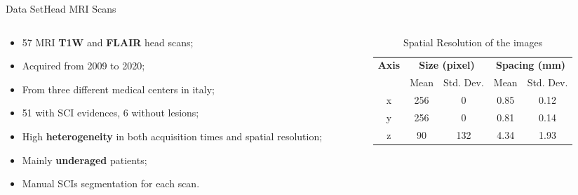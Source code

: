 \documentclass[]{standalone}
\begin{document}
	\begin{frame}{Data Set}{Head MRI Scans}
	\vspace{-25pt}
	\begin{columns}
		\begin{column}{0.5\textwidth}
		\begin{exampleblock}{}
		\begin{itemize}
		\footnotesize
			\item 57 MRI \textbf{T1W} and \textbf{FLAIR} head scans;
			\item Acquired from 2009 to 2020;
			\item From three different medical centers in italy;
			\item 51 with SCI evidences, 6 without lesions;
			\item High \textbf{heterogeneity} in both acquisition times and spatial resolution;
			\item Mainly \textbf{underaged} patients;
			\item Manual SCIs segmentation for each scan.
		\end{itemize}
		\end{exampleblock}
		\end{column}
		\begin{column}{0.52\textwidth}
		\begin{block}{}
		\begin{table}[h!]
			\footnotesize
			\setlength{\tabcolsep}{3pt}
			\centering
			\begin{tabular}{|c|cc|cc|}
			\hline
			\textbf{Axis} & \multicolumn{2}{c|}{\textbf{Size (pixel)}} & \multicolumn{2}{c|}{\textbf{Spacing (mm)}} \\
			  & Mean & Std. Dev. & Mean & Std. Dev. \\ \hline
			x & 256  & 0         & 0.85 & 0.12      \\
			y & 256  & 0         & 0.81 & 0.14      \\
			z & 90   & 132       & 4.34 & 1.93      \\ \hline
			\end{tabular}
		\caption*{Spatial Resolution of the images}
		\end{table}
		\vspace{-10pt}
		\end{block}
		\end{column}
	\end{columns}
	\end{frame}
\end{document}

